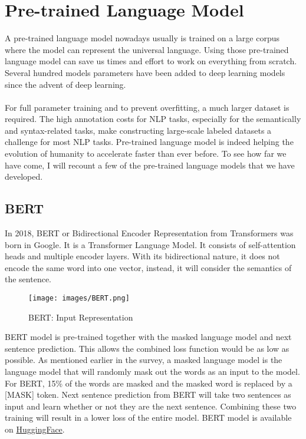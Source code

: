 \documentclass[a4paper, 11pt]{article}
\begin{document}
\section{Pre-trained Language Model}

A pre-trained language model nowadays usually is trained on a large corpus where the model can represent the universal language. Using those pre-trained language model can save us times and effort to work on everything from scratch. Several hundred models parameters have been added to deep learning models since the advent of deep learning. \\
\\
For full parameter training and to prevent overfitting, a much larger dataset is required. The high annotation costs for NLP tasks, especially for the semantically and syntax-related tasks, make constructing large-scale labeled datasets a challenge for most NLP tasks. Pre-trained language model is indeed helping the evolution of humanity to accelerate faster than ever before. To see how far we have come, I will recount a few of the pre-trained language models that we have developed.

\subsection{BERT}

In 2018, BERT \cite{DBLP:journals/corr/abs-1810-04805}or Bidirectional Encoder Representation from Transformers was born in Google. It is a Transformer Language Model. It consists of self-attention heads and multiple encoder layers. With its bidirectional nature, it does not encode the same word into one vector, instead, it will consider the semantics of the sentence. \\

\begin{figure}[h]
    \centering
    \texttt{[image: images/BERT.png]}
    \caption{BERT\cite{DBLP:journals/corr/abs-1810-04805}: Input Representation}
    \label{fig:mesh1}
\end{figure}

BERT model is pre-trained together with the masked language model and next sentence prediction. This allows the combined loss function would be as low as possible. As mentioned earlier in the survey, a masked language model is the language model that will randomly mask out the words as an input to the model. For BERT, 15\% of the words are masked and the masked word is replaced by a [MASK] token. Next sentence prediction from BERT will take two sentences as input and learn whether or not they are the next sentence. Combining these two training will result in a lower loss of the entire model. BERT model is available on \href{https://huggingface.co/docs/transformers/model_doc/bert}{HuggingFace}.
\end{document}
